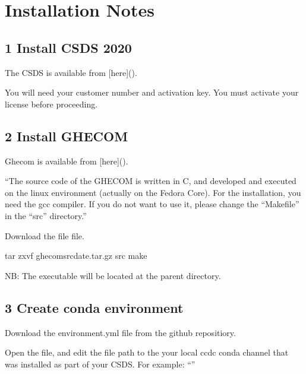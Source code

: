 \documentclass[letterpaper,10pt,english]{sphinxmanual}
\begin{document}
\chapter{Installation Notes}
\label{\detokenize{tutorial:installation-notes}}

\section{1 Install CSDS 2020}
\label{\detokenize{tutorial:install-csds-2020}}
The CSDS is available from {[}here{]}().

You will need your customer number and activation key. You must activate your license before proceeding.


\section{2 Install GHECOM}
\label{\detokenize{tutorial:install-ghecom}}
Ghecom is available from {[}here{]}().

“The source code of the GHECOM is written in C, and developed and executed on
the linux environment (actually on the Fedora Core).  For the installation,
you need the gcc compiler.  If you do not want to use it, please change the
“Makefile” in the “src” directory.”

Download the file  file.

\begin{sphinxVerbatim}[commandchars=\\\{\}]
tar zxvf ghecom\PYGZhy{}src\PYGZhy{}\PYG{o}{[}date\PYG{o}{]}.tar.gz
 src
make
\end{sphinxVerbatim}

NB: The executable will be located at the parent directory.


\section{3 Create conda environment}
\label{\detokenize{tutorial:create-conda-environment}}
Download the environment.yml file from the github repositiory.

Open the file, and edit the file path to the your local ccdc conda channel
that was installed as part of your CSDS. For example: “”
\end{document}
